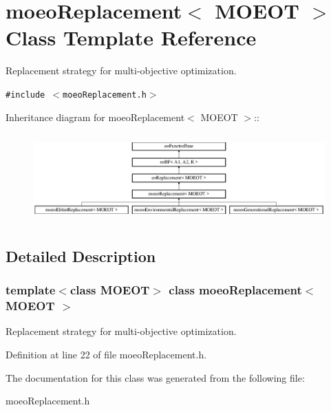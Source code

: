 \section{moeo\-Replacement$<$ MOEOT $>$ Class Template Reference}
\label{classmoeoReplacement}
Replacement strategy for multi-objective optimization.  


{\tt \#include $<$moeo\-Replacement.h$>$}

Inheritance diagram for moeo\-Replacement$<$ MOEOT $>$::\begin{figure}[H]
\begin{center}
\leavevmode
\includegraphics[height=3.43137cm]{classmoeoReplacement}
\end{center}
\end{figure}


\subsection{Detailed Description}
\subsubsection*{template$<$class MOEOT$>$ class moeo\-Replacement$<$ MOEOT $>$}

Replacement strategy for multi-objective optimization. 



Definition at line 22 of file moeo\-Replacement.h.

The documentation for this class was generated from the following file:\begin{CompactItemize}
\item 
moeo\-Replacement.h\end{CompactItemize}
